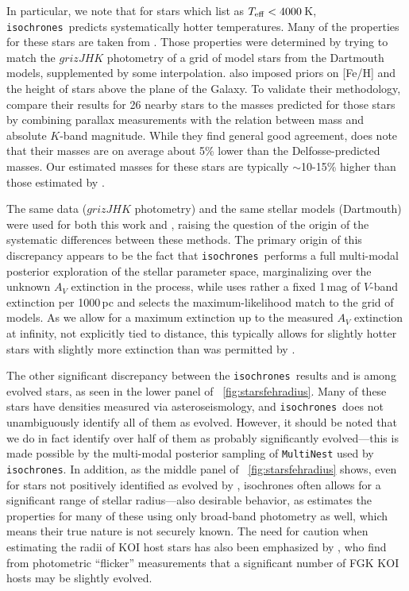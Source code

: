 \documentclass{emulateapj}
\newcommand{\figref}[1]{\ref{fig:#1}}
\newcommand{\Fig}[1]{\figurename~\figref{#1}}
\newcommand{\fig}[1]{\Fig{#1}}
\newcommand{\isochrones}{\texttt{isochrones}}
\begin{document}
In particular, we note that for stars which 
list as $T_{\rm eff} < 4000$\,K, \isochrones\ predicts systematically
hotter temperatures.  Many of the  properties
for these stars are taken from
\citet[][]{Dressing:2013}.  Those properties
were determined by trying to match the $grizJHK$ photometry
of a grid of model stars from the Dartmouth models, supplemented by
some interpolation.   also imposed priors
on [Fe/H] and the height of stars above the plane of the Galaxy.  To
validate their methodology,  compare their
results for 26 nearby stars to the masses predicted for those stars by
combining parallax measurements with the \citet{Delfosse:2000}
relation between mass and absolute $K$-band magnitude.  While they
find general good agreement,  does note that
their masses are on average about 5\% lower than the Delfosse-predicted
masses.  Our estimated masses for these stars are typically
$\sim$10-15\% higher than those estimated by .

The same data ($grizJHK$ photometry) and the same stellar models
(Dartmouth) were used for both this work and
, raising the question of the origin of the
systematic differences between these methods.  The primary origin of
this discrepancy appears to be the fact that \isochrones\ performs a
full multi-modal posterior exploration of the stellar parameter space,
marginalizing over the unknown $A_V$ extinction in the process, while
 uses rather a fixed 1\,mag of $V$-band
extinction per 1000\,pc and selects the maximum-likelihood
match to the grid of models.  As we allow for a maximum extinction up
to the measured $A_V$ extinction at infinity, not explicitly tied to
distance, this typically allows for slightly hotter stars with
slightly more extinction than was permitted by \citet{Dressing:2013}.

The other significant discrepancy between the \isochrones\ results and
 is among evolved stars, as seen in the lower
panel of \fig{starsfehradius}.  Many of these stars have densities
measured via asteroseismology, and \isochrones\ does not unambiguously
identify all of them as evolved.  However, it should be noted that we
do in fact identify over half of them as probably significantly
evolved---this is made possible by the multi-modal posterior sampling
of \texttt{MultiNest} used by \isochrones.  In addition, as the middle
panel of \fig{starsfehradius} shows, even for stars not positively
identified as evolved by , isochrones often
allows for a significant range of stellar radius---also desirable
behavior, as  estimates the properties for many
of these using only broad-band photometry as well, which means their
true nature is not securely known.  The need for caution when
estimating the radii of KOI host stars has also been emphasized by
, who find from photometric ``flicker''
measurements that a significant number of FGK KOI hosts may be
slightly evolved.
\end{document}
